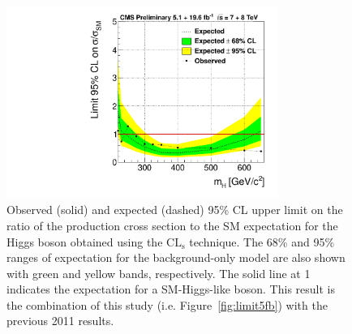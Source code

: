 %


\begin{figure}[htbp]
 \centerline{
   \includegraphics[width=0.79\textwidth]{plots/limit_observed_all-btag_combi.pdf}
}
 
\caption{
Observed (solid) and expected (dashed) 95\% CL upper limit on the ratio of the production cross section to the SM expectation for the Higgs boson obtained using the $\mathrm{CL_s}$ technique. The 68\% and 95\% ranges of expectation for the background-only model are also shown with green and yellow bands, respectively.  The solid line at 1 indicates the expectation for a SM-Higgs-like boson. This result is the combination of this study (i.e. Figure~\ref{fig:limit5fb}) with the previous 2011 results.
}
\label{fig:combination}
\end{figure}


